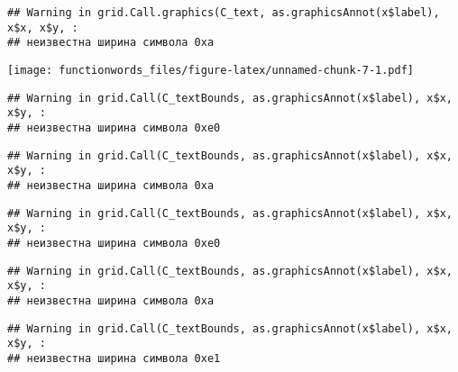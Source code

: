 \documentclass[
]{article}
\newenvironment{Shaded}{\begin{snugshade}}{\end{snugshade}}
\newcommand{\DataTypeTok}[1]{\textcolor[rgb]{0.13,0.29,0.53}{#1}}
\newcommand{\KeywordTok}[1]{\textcolor[rgb]{0.13,0.29,0.53}{\textbf{#1}}}
\newcommand{\NormalTok}[1]{#1}
\newcommand{\OperatorTok}[1]{\textcolor[rgb]{0.81,0.36,0.00}{\textbf{#1}}}
\newcommand{\StringTok}[1]{\textcolor[rgb]{0.31,0.60,0.02}{#1}}
\begin{document}
\begin{verbatim}
## Warning in grid.Call.graphics(C_text, as.graphicsAnnot(x$label), x$x, x$y, :
## неизвестна ширина символа 0xa
\end{verbatim}

\texttt{[image: functionwords\_files/figure-latex/unnamed-chunk-7-1.pdf]}

\begin{Shaded}
\end{Shaded}

\begin{verbatim}
## Warning in grid.Call(C_textBounds, as.graphicsAnnot(x$label), x$x, x$y, :
## неизвестна ширина символа 0xe0
\end{verbatim}

\begin{verbatim}
## Warning in grid.Call(C_textBounds, as.graphicsAnnot(x$label), x$x, x$y, :
## неизвестна ширина символа 0xa
\end{verbatim}

\begin{verbatim}
## Warning in grid.Call(C_textBounds, as.graphicsAnnot(x$label), x$x, x$y, :
## неизвестна ширина символа 0xe0
\end{verbatim}

\begin{verbatim}
## Warning in grid.Call(C_textBounds, as.graphicsAnnot(x$label), x$x, x$y, :
## неизвестна ширина символа 0xa
\end{verbatim}

\begin{verbatim}
## Warning in grid.Call(C_textBounds, as.graphicsAnnot(x$label), x$x, x$y, :
## неизвестна ширина символа 0xe1
\end{verbatim}
\end{document}
